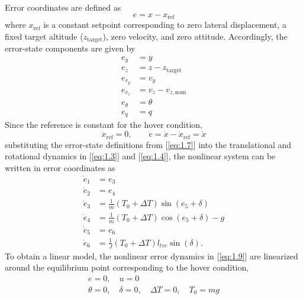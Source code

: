 \documentclass[10pt,twocolumn,twoside]{IEEEtran}
\begin{document}
Error coordinates are defined as
\begin{equation}
    e = x - x_{\mathrm{ref}}
    \label{eq:1.5}
\end{equation}
where $x_{\mathrm{ref}}$ is a constant setpoint corresponding to zero lateral displacement, a fixed target altitude ($z_{\mathrm{target}}$), zero velocity, and zero attitude. Accordingly, the error-state components are given by
\begin{equation}
    \begin{aligned}
        e_y &= y \\
        e_z &= z - z_{\mathrm{target}} \\
        e_{v_y} &= v_y \\
        e_{v_z} &= v_z - v_{z,\mathrm{nom}} \\
        e_{\theta} &= \theta \\
        e_q &= q
    \end{aligned}
    \label{eq:1.7}
\end{equation}
Since the reference is constant for the hover condition,
\begin{equation}
    \dot{x}_{\mathrm{ref}} = 0,
    \qquad
    \dot{e} = \dot{x} - \dot{x}_{\mathrm{ref}} = \dot{x}
    \label{eq:1.8}
\end{equation}
substituting the error-state definitions from [\ref{eq:1.7}] into the translational and rotational dynamics in [\ref{eq:1.3}] and [\ref{eq:1.4}], the nonlinear system can be written in error coordinates as
\begin{equation}
    \begin{aligned}
        \dot{e}_1 &= e_3 \\
        \dot{e}_2 &= e_4 \\
        \dot{e}_3 &= \frac{1}{m}(T_0+\Delta T)\sin(e_5+\delta) \\
        \dot{e}_4 &= \frac{1}{m}(T_0+\Delta T)\cos(e_5+\delta) - g \\
        \dot{e}_5 &= e_6 \\
        \dot{e}_6 &= \frac{1}{J}(T_0+\Delta T)l_{tvc}\sin(\delta).
    \end{aligned}
    \label{eq:1.9}
\end{equation}
To obtain a linear model, the nonlinear error dynamics in [\ref{eq:1.9}] are linearized around the equilibrium point corresponding to the hover condition,
\begin{equation}
    \begin{gathered}
        e = 0, \quad u = 0\\
        \theta = 0, \quad \delta = 0, \quad \Delta T = 0, \quad T_0 = mg
    \end{gathered}
    \label{eq:1.10}
\end{equation}
\end{document}

